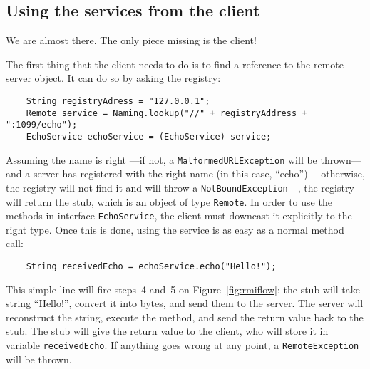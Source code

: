 

\subsection{Using the services from the client}
\label{sec:using-services-from}

We are almost there. The only piece missing is the client! 

The first thing that the client needs to do is to find a
reference to the remote server object. It can do so by asking the
registry:

\begin{verbatim}
    String registryAdress = "127.0.0.1";
    Remote service = Naming.lookup("//" + registryAddress + ":1099/echo"); 
    EchoService echoService = (EchoService) service;
\end{verbatim}

Assuming the name is right ---if not, a \verb+MalformedURLException+
will be thrown--- and a server has registered with the right name (in
this case, ``echo'') ---otherwise, the registry will not find it and
will throw a \verb+NotBoundException+---, the registry will return the
stub, which is an object of type \verb+Remote+. In order to use the
methods in interface \verb+EchoService+, the client must downcast it
explicitly to the right type. Once this is done, using the service is
as easy as a normal method call:

\begin{verbatim}
    String receivedEcho = echoService.echo("Hello!");
\end{verbatim}

This simple line will fire steps~4 and~5 
on Figure~\ref{fig:rmiflow}: the stub
will take string ``Hello!'', convert it into bytes, and send them to
the server. The server will reconstruct the string, execute the
method, and send the return value back to the stub. The stub will give
the return value to the client, who will store it in variable
\verb+receivedEcho+. If anything goes wrong at any point, a
\verb+RemoteException+ will be thrown. 

